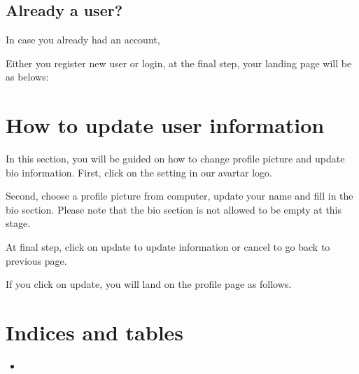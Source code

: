 \documentclass[letterpaper,10pt,english]{sphinxmanual}
\begin{document}
\noindent{}


\section{Already a user?}
\label{\detokenize{pages/user-registration:already-a-user}}
\sphinxAtStartPar
In case you already had an account,

\noindent{}

\sphinxAtStartPar
Either you register new user or login, at the final step, your landing page will be as belows:

\noindent{}

\sphinxstepscope


\chapter{How to update user information}
\label{\detokenize{pages/update-user-info:how-to-update-user-information}}\label{\detokenize{pages/update-user-info::doc}}
\sphinxAtStartPar
In this section, you will be guided on how to change profile picture and update bio information.
First, click on the setting in our avartar logo.

\noindent{}

\sphinxAtStartPar
Second, choose a profile picture from computer, update your name and fill in the bio section. Please note that the bio section is not allowed to be empty at this stage.

\sphinxAtStartPar
At final step, click on update to update information or cancel to go back to previous page.

\sphinxAtStartPar
If you click on update, you will land on the profile page as follows.

\noindent{}


\chapter{Indices and tables}
\label{\detokenize{index:indices-and-tables}}\begin{itemize}
\item {} 
\sphinxAtStartPar
{}

\end{itemize}



\renewcommand{\indexname}{Index}
\printindex
\end{document}
